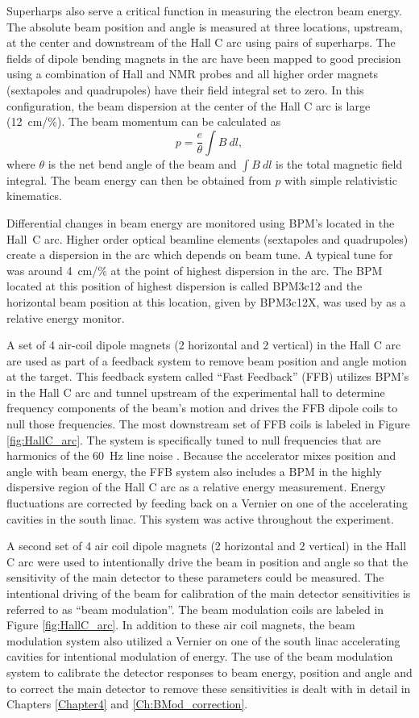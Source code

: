 Superharps also serve a critical function in measuring the electron beam energy. The absolute beam position and angle is measured at three locations, upstream, at the center and downstream of the Hall C arc using pairs of superharps. The fields of dipole bending magnets in the arc have been mapped to good precision using a combination of Hall and NMR probes and all higher order magnets (sextapoles and quadrupoles) have their field integral set to zero. In this configuration, the beam dispersion at the center of the Hall C arc is large (12~cm/\%). The beam momentum can be calculated as 
\[
p=\frac{e}{\theta}\int B~dl,
\]
where $\theta$ is the net bend angle of the beam and $\int B~dl$ is the total magnetic field integral. The beam energy can then be obtained from $p$ with simple relativistic kinematics.

Differential changes in beam energy are monitored using BPM's located in the Hall~C arc. Higher order optical beamline elements (sextapoles and quadrupoles) create a dispersion in the arc which depends on beam tune. A typical tune for \Qs was around 4~cm/\% at the point of highest dispersion in the arc. The BPM located at this position of highest dispersion is called BPM3c12 and the horizontal beam position at this location, given by BPM3c12X, was used by \Qs as a relative energy monitor. 

A set of 4 air-coil dipole magnets (2 horizontal and 2 vertical) in the Hall C arc are used as part of a feedback system to remove beam position and angle motion at the target. This feedback system called ``Fast Feedback'' (FFB) utilizes BPM's in the Hall C arc and tunnel upstream of the experimental hall to determine frequency components of the beam's motion and drives the FFB dipole coils to null those frequencies. The most downstream set of FFB coils is labeled in Figure \ref{fig:HallC_arc}. The system is specifically tuned to null frequencies that are harmonics of the 60~Hz line noise \cite{Lebedev}. Because the accelerator mixes position and angle with beam energy, the FFB system also includes a BPM in the highly dispersive region of the Hall C arc as a relative energy measurement. Energy fluctuations are corrected by feeding back on a Vernier on one of the accelerating cavities in the south linac. This system was active throughout the \Qs experiment.

A second set of 4 air coil dipole magnets (2 horizontal and 2 vertical) in the Hall C arc were used to intentionally drive the beam in position and angle so that the sensitivity of the main detector to these parameters could be measured. The intentional driving of the beam for calibration of the main detector sensitivities is referred to as ``beam modulation''. The beam modulation  coils are labeled in Figure \ref{fig:HallC_arc}. In addition to these air coil magnets, the beam modulation system also utilized a Vernier on one of the south linac accelerating cavities for intentional modulation of energy. The use of the beam modulation system to calibrate the detector responses to beam energy, position and angle and to correct the main detector to remove these sensitivities is dealt with in detail in Chapters \ref{Chapter4} and \ref{Ch:BMod_correction}.

